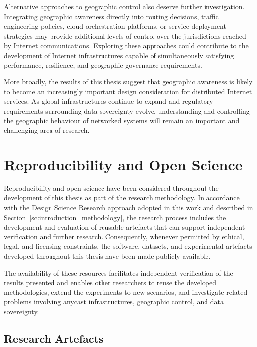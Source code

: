 \documentclass[
A4paper,                %
twoside,                %
openright,              %
chapterprefix=true,     %
12pt,                   %
headings=normal,        %
titlepage=on            %
]{book}
\begin{document}
Alternative approaches to geographic control also deserve further investigation. Integrating geographic awareness directly into routing decisions, traffic engineering policies, cloud orchestration platforms, or service deployment strategies may provide additional levels of control over the jurisdictions reached by Internet communications. Exploring these approaches could contribute to the development of Internet infrastructures capable of simultaneously satisfying performance, resilience, and geographic governance requirements.

More broadly, the results of this thesis suggest that geographic awareness is likely to become an increasingly important design consideration for distributed Internet services. As global infrastructures continue to expand and regulatory requirements surrounding data sovereignty evolve, understanding and controlling the geographic behaviour of networked systems will remain an important and challenging area of research.

\section{Reproducibility and Open Science}
\label{sc:conclusion_reproducibility}

Reproducibility and open science have been considered throughout the development of this thesis as part of the research methodology. In accordance with the Design Science Research approach adopted in this work and described in Section~\ref{sc:introduction_methodology}, the research process includes the development and evaluation of reusable artefacts that can support independent verification and further research. Consequently, whenever permitted by ethical, legal, and licensing constraints, the software, datasets, and experimental artefacts developed throughout this thesis have been made publicly available.

The availability of these resources facilitates independent verification of the results presented and enables other researchers to reuse the developed methodologies, extend the experiments to new scenarios, and investigate related problems involving anycast infrastructures, geographic control, and data sovereignty.

\subsection{Research Artefacts}
\label{sc:conclusion_research_artefacts}
\end{document}
